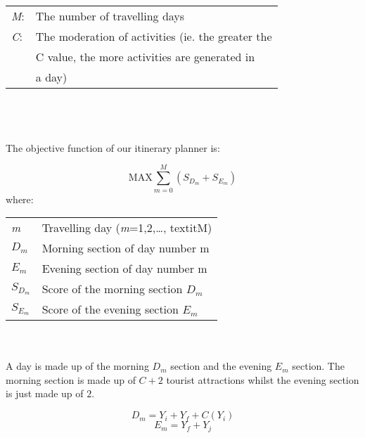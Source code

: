 

\setlength{\tabcolsep}{20pt}

\begin{tabular}{l l}

\textit{M}:  &  The number of travelling days \\
\textit{C}: & The moderation of activities (ie. the greater the \\
 & C value, the more activities are generated in \\
 & a day) \\  
\end{tabular}
\\
\\
\\
The objective function of our itinerary planner is:

\[ \text{MAX}  \sum_{m=0}^{M} ( S_{{D_m}} + S_{{E_m}}) \]
where:
\\
\begin{tabular}{l l}
\textit{m} & Travelling day (\textit{m}=1,2,\ldots, textit{M}) \\ 
\textit{$D_m$} & Morning section of day number m \\  
\textit{$E_m$} & Evening section of day number m \\  
\textit{$S_{D_m}$} & Score of the morning section $D_m$ \\  
\textit{$S_{E_m}$} & Score of the evening section $E_m$ \\  
\end{tabular}
\\
\\
A day is made up of the morning ${D_m}$ section and the evening ${E_m}$ section. The morning section is made up of $C + 2$ tourist attractions whilst the evening section is just made up of $2$. 

\[D_m = Y_i + Y_f + C ( Y_i) \]
\[E_m = Y_f + Y_j \]

